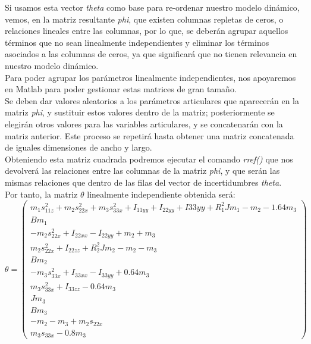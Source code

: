 		Si usamos esta vector \textit{theta} como base para re-ordenar nuestro modelo dinámico, vemos, en la matriz resultante \textit{phi},
		que existen columnas repletas de ceros, o relaciones lineales entre las columnas, por lo que, se deberán
		agrupar aquellos términos que no sean linealmente independientes y eliminar los términos asociados
		a las columnas de ceros, ya que significará que no tienen relevancia en nuestro modelo dinámico.\\

		Para poder agrupar los parámetros linealmente independientes, nos apoyaremos en Matlab para poder gestionar
		estas matrices de gran tamaño.\\
		Se deben dar valores aleatorios a los parámetros articulares que aparecerán en la matriz \textit{phi}, y sustituir estos
		valores dentro de la matriz; posteriormente se elegirán otros valores para las variables articulares,  y se concatenarán
		con la matriz anterior. Este proceso se repetirá hasta obtener una matriz concatenada de iguales dimensiones de ancho y largo.\\

		Obteniendo esta matriz cuadrada podremos ejecutar el comando \textit{rref()} que nos devolverá las relaciones entre las columnas de la matriz \textit{phi}, y que serán las mismas relaciones que dentro de las filas del vector de incertidumbres \textit{theta}.\\

Por tanto, la matriz $\theta$ linealmente independiente obtenida será:
			\[
			\theta=
				\begin{pmatrix}
					  m_{1}s_{11z}^{2} + m_{2}s_{22x}^{2} + m_{3}s_{33x}^{2} + I_{11yy} + I_{22yy} + I{33yy} + R_{1}^{2}Jm_1 - m_2 - 1.64m_3 \\
					  Bm_{1}  \\
					  -m_{2}s_{22x}^{2} + I_{22xx} - I_{22yy} + m_{2} + m_{3} \\
					  m_{2}s_{22x}^{2} + I_{22zz} + R_{2}^{2}Jm_{2} - m_{2} - m_{3}  \\
					  Bm_{2} \\
					  - m_{3}s_{33x}^{2} + I_{33xx} - I_{33yy} + 0.64m_{3} \\
					  m_{3}s_{33x}^{2} + I_{33zz} - 0.64m_{3}  \\
					  Jm_{3}  \\
					  Bm_{3}  \\
					  -m_{2} -m_{3} + m_{2}s_{22x}  \\
					  m_{3}s_{33x} - 0.8m_{3}
				\end{pmatrix}
			\]

